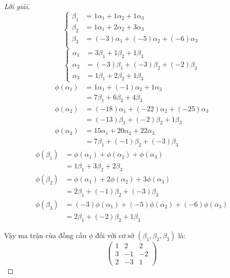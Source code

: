 \begin{proof}[Lời giải]
    \[
        \begin{cases}
            \beta_{1} & = 1\alpha_{1} + 1\alpha_{2} + 1\alpha_{3}          \\
            \beta_{2} & = 1\alpha_{1} + 2\alpha_{2} + 3\alpha_{3}          \\
            \beta_{3} & = (-3)\alpha_{1} + (-5)\alpha_{2} + (-6)\alpha_{3} \\
        \end{cases}
    \]
    \[
        \begin{cases}
            \alpha_{1} & = 3\beta_{1} + 1\beta_{2} + 1\beta_{3}          \\
            \alpha_{2} & = (-3)\beta_{1} + (-3)\beta_{2} + (-2)\beta_{3} \\
            \alpha_{3} & = 1\beta_{1} + 2\beta_{2} + 1\beta_{3}
        \end{cases}
    \]
    \begin{align*}
        \phi(\alpha_{1}) & = 1\alpha_{1} + (-1)\alpha_{2} + 1\alpha_{3}          \\
                         & = 7\beta_{1} + 6\beta_{2} + 4\beta_{3}                \\
        \phi(\alpha_{2}) & = (-18)\alpha_{1} + (-22)\alpha_{2} + (-25)\alpha_{3} \\
                         & = (-13)\beta_{1} + (-2)\beta_{2} + 1\beta_{3}         \\
        \phi(\alpha_{3}) & = 15\alpha_{1} + 20\alpha_{2} + 22\alpha_{3}          \\
                         & = 7\beta_{1} + (-1)\beta_{2} + (-3)\beta_{3}
    \end{align*}
    \begin{align*}
        \phi(\beta_{1}) & = \phi(\alpha_{1}) + \phi(\alpha_{2}) + \phi(\alpha_{3})             \\
                        & = 1\beta_{1} + 3\beta_{2} + 2\beta_{3}                               \\
        \phi(\beta_{2}) & = \phi(\alpha_{1}) + 2\phi(\alpha_{2}) + 3\phi(\alpha_{3})           \\
                        & = 2\beta_{1} + (-1)\beta_{2} + (-3)\beta_{3}                         \\
        \phi(\beta_{3}) & = (-3)\phi(\alpha_{1}) + (-5)\phi(\alpha_{2}) + (-6)\phi(\alpha_{3}) \\
                        & = 2\beta_{1} + (-2)\beta_{2} + 1\beta_{3}
    \end{align*}
    
    Vậy ma trận của đồng cấu $\phi$ đối với cơ sở $(\beta_{1}, \beta_{2}, \beta_{3})$ là:
    \[
        \begin{pmatrix}
            1 & 2  & 2  \\
            3 & -1 & -2 \\
            2 & -3 & 1
        \end{pmatrix}
    \]
\end{proof}

